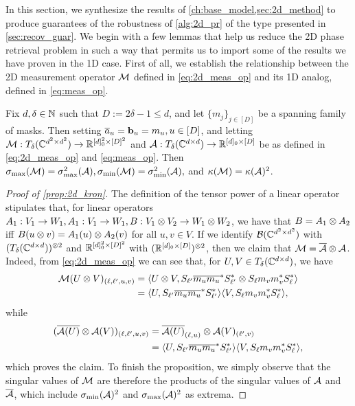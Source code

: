 In this section, we synthesize the results of \cref{ch:base_model,sec:2d_method} to produce guarantees of the robustness of \cref{alg:2d_pr} of the type presented in \cref{sec:recov_guar}.  We begin with a few lemmas that help us reduce the 2D phase retrieval problem in such a way that permits us to import some of the results we have proven in the 1D case.  First of all, we establish the relationship between the 2D measurement operator $\mathcal{M}$ defined in \eqref{eq:2d_meas_op} and its 1D analog, defined in \eqref{eq:meas_op}.

\begin{proposition}
  Fix $d, \delta \in \mathbb{N}$ such that $D := 2 \delta - 1 \le d$, and let $\{m_j\}_{j \in [D]}$ be a spanning family of masks.  Then setting $\overline{a}_u = \mathbf b_u = m_u, u \in [D]$, and letting $\mathcal{M} : T_\delta(\mathbb{C}^{d^2 \times d^2}) \to \mathbb{R}^{[d]_0^2 \times [D]^2}$ and $\mathcal{A} : T_\delta(\mathbb{C}^{d \times d}) \to \mathbb{R}^{[d]_0 \times [D]}$ be as defined in \eqref{eq:2d_meas_op} and \eqref{eq:meas_op}.  Then $\sigma_{\max}(\mathcal{M}) = \sigma_{\max}^2(\mathcal{A}), \sigma_{\min}(\mathcal{M}) = \sigma_{\min}^2(\mathcal{A}),$ and $\kappa(\mathcal{M}) = \kappa(\mathcal{A})^2$.
  \label{prop:2d_kron}
\end{proposition}

\begin{proof}[Proof of \cref{prop:2d_kron}]
  The definition of the tensor power of a linear operator stipulates that, for linear operators $A_1 : V_1 \to W_1, A_1 : V_1 \to W_1, B : V_1 \otimes V_2 \to W_1 \otimes W_2$, we have that $B = A_1 \otimes A_2$ iff $B(u \otimes v) = A_1(u) \otimes A_2(v)$ for all $u, v \in V$.  If we identify $\mathcal{B}(\mathbb{C}^{d^2 \times d^2})$ with $(T_\delta(\mathbb{C}^{d \times d}))^{\otimes 2}$ and $\mathbb{R}^{[d]_0^2 \times [D]^2}$ with $(\mathbb{R}^{[d]_0 \times [D]})^{\otimes 2}$, then we claim that $\mathcal{M} = \overline{\mathcal{A}} \otimes \mathcal{A}$.  Indeed, from \eqref{eq:2d_meas_op} we can see that, for $U, V \in T_\delta(\mathbb{C}^{d \times d})$, we have
  \begin{align*}
    \mathcal{M}(U \otimes V)_{(\ell, \ell', u, v)} &= \langle U \otimes V, S_{\ell'} \overline{m_u}\overline{m_u}^* S^*_{\ell'} \otimes S_\ell m_v m_v^* S^*_\ell\rangle \\
    &= \langle U, S_{\ell'} \overline{m_u}\overline{m_u}^* S^*_{\ell'}\rangle \langle V, S_\ell m_v m_v^* S^*_\ell\rangle,
  \end{align*}
  while
  \begin{align*}
    (\overline{\mathcal{A}(U)} \otimes \mathcal{A}(V))_{(\ell, \ell', u, v)} &= \overline{\mathcal{A}(U)}_{(\ell, u)} \otimes \mathcal{A}(V)_{(\ell', v)} \\
    &= \langle U, S_{\ell'} \overline{m_u}\overline{m_u}^* S^*_{\ell'}\rangle \langle V, S_\ell m_v m_v^* S^*_\ell\rangle,
  \end{align*}
  which proves the claim.  To finish the proposition, we simply observe that the singular values of $\mathcal{M}$ are therefore the products of the singular values of $\mathcal{A}$ and $\overline{\mathcal{A}}$, which include $\sigma_{\min}(\mathcal{A})^2$ and $\sigma_{\max}(\mathcal{A})^2$ as extrema.
\end{proof}

